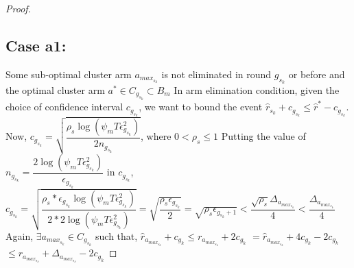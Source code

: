 \begin{proof}

\subsection{Case a1:} 
Some sub-optimal cluster arm $a_{max_{s_{k}}}$ is not eliminated in round $g_{s_{k}}$ or before and the optimal cluster arm $a^{*}\in C_{g_{s_{k}}} \subset B_{m}$
\newline In arm elimination condition, given the choice of confidence interval $c_{g_{s_{k}}}$, we want to bound the event $\hat{r}_{s_{k}}+c_{g_{s_{k}}}\leq \hat{r}^{*}-c_{g_{s_{k}}}$.
\newline Now, $c_{g_{s_{k}}}=\sqrt{\dfrac{\rho_{s} \log (\psi_{m}T\epsilon_{g_{s_{k}}}^{2})}{2 n_{g_{s_{k}}}}}$, where $0 < \rho_{s}\leq 1$
\newline Putting the value of $n_{g_{s_{k}}}=\dfrac{2\log{(\psi_{m}T\epsilon_{g_{s_{k}}}^{2})}}{\epsilon_{g_{s_{k}}}}$ in $c_{g_{s_{k}}}$,
\newline $c_{g_{s_{k}}}=\sqrt{\dfrac{\rho_{s}*\epsilon_{g_{s_{k}}}\log (\psi_{m}T\epsilon_{g_{s_{k}}}^{2})}{2*2 \log(\psi_{m}T\epsilon_{g_{s_{k}}}^{2})}}=\sqrt{\dfrac{\rho_{s}\epsilon_{g_{s_{k}}}}{2}} = \sqrt{\rho_{s}\epsilon_{g_{s_{k}}+1}} < \dfrac{\sqrt{\rho_{s}}\Delta_{a_{max_{s_{k}}}}}{4} < \dfrac{\Delta_{a_{max_{s_{k}}}}}{4} $
\newline Again, $\exists a_{max_{s_{k}}} \in C_{g_{s_{k}}}$ such that, 
$\hat{r}_{a_{max_{s_{k}}}} + c_{g_{k}}\leq r_{a_{max_{s_{k}}}} + 2c_{g_{k}} $
\newline\hspace*{14em}$= \hat{r}_{a_{max_{s_{k}}}} + 4c_{g_{k}} - 2c_{g_{k}} $
\newline\hspace*{14em}$\leq r_{a_{max_{s_{k}}}} + \Delta_{a_{max_{s_{k}}}} - 2c_{g_{k}}$

\end{proof}
